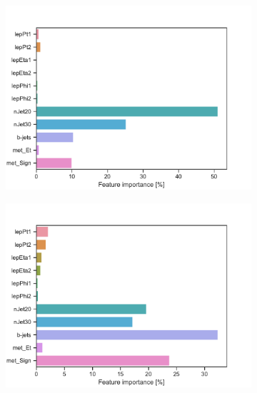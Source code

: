 \begin{figure}[H]
\begin{subfigure}[t!]{0.49\textwidth}
        \caption{}
        \label{fig:featSlepsnuLow}
    \end{subfigure}
    \begin{subfigure}[t!]{0.49\textwidth}
        \includegraphics[width = \textwidth]{Figures/WW/BDT/Low_level/Low/featureImportance.pdf}
        \caption{}
        \label{fig:featWWLow}
    \end{subfigure}
    \begin{subfigure}[t!]{0.49\textwidth}
        \includegraphics[width = \textwidth]{Figures/Mono_Z/ML/BDT/Low_level/Low/featureImportance.pdf}
        \caption{}
        \label{fig:featMonoZLow}
    \end{subfigure}
    \caption{}
    \label{fig:resExample}
\end{figure}

